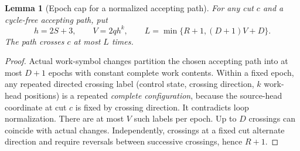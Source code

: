 \documentclass[11pt]{article}
\newtheorem{lemma}[theorem]{Lemma}
\begin{document}
\begin{lemma}[Epoch cap for a normalized accepting path]
For any cut $c$ and a cycle-free accepting path, put
\[
h=2S+3,\qquad V=2qh^k,\qquad
L=\min\{R+1,(D+1)V+D\}.
\tag{3}
\]
The path crosses $c$ at most $L$ times.
\end{lemma}
\begin{proof}
Actual work-symbol changes partition the chosen accepting path into at most $D+1$ epochs with constant complete work contents. Within a fixed epoch, any repeated directed crossing label (control state, crossing direction, $k$ work-head positions) is a repeated \emph{complete configuration}, because the source-head coordinate at cut $c$ is fixed by crossing direction. It contradicts loop normalization. There are at most $V$ such labels per epoch. Up to $D$ crossings can coincide with actual changes. Independently, crossings at a fixed cut alternate direction and require reversals between successive crossings, hence $R+1$.
\end{proof}
\end{document}
